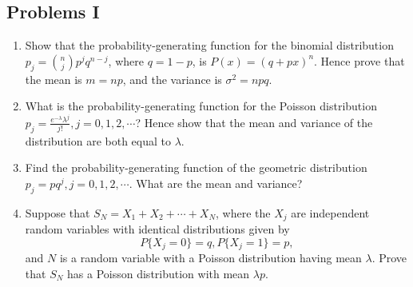 \subsection*{Problems I} 

\begin{enumerate}
\item Show that the probability-generating function for the binomial distribution $p_j = \binom{n}{j} p^j q^{n-j}$, where $ q = 1 - p$, is $P(x) = (q + px)^n$. Hence prove that the mean is $m = np$, and the variance is $\sigma^2 = npq$. 

\item What is the probability-generating function for the Poisson distribution $p_j = \frac{e^{-\lambda} \lambda^j}{j!}, j = 0, 1, 2, \cdots$? Hence show that the mean and variance of the distribution are both equal to $\lambda$. 

\item Find the probability-generating function of the geometric distribution $p_j = pq^j, j = 0, 1, 2, \cdots$. What are the mean and variance? 

\item Suppose that $S_N = X_1 + X_2 + \cdots + X_N$, where the $X_j$ are independent random variables with identical distributions given by $$P \{ X_j = 0 \} = q, P \{ X_j = 1 \} = p,$$ and $N$ is a random variable with a Poisson distribution having mean $\lambda$. Prove that $S_N$ has a Poisson distribution with mean $\lambda p$. 
\end{enumerate}
